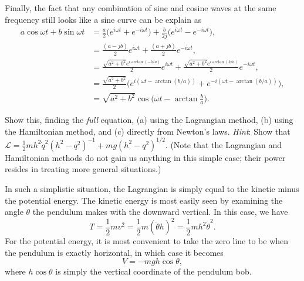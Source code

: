 \documentclass[../road-to-reality.tex]{subfiles}
\begin{document}
\begin{questions}
\begin{solution}
    Finally, the fact that any combination of sine and cosine waves at the same
    frequency still looks like a sine curve can be explain as
    \begin{align*}
      a\cos\omega{t} + b\sin\omega{t} &= \frac{a}{2}\Big(e^{i\omega{t}} + e^{-i\omega{t}}\Big) + \frac{b}{2j}\Big(e^{i\omega{t}} - e^{-i\omega{t}}\Big), \\
                                      &= \frac{(a - jb)}{2}e^{i\omega{t}} + \frac{(a + jb)}{2}e^{-i\omega{t}}, \\
                                      &= \frac{\sqrt{a^2+b^2}e^{i\arctan(-b/a)}}{2}e^{i\omega{t}} + \frac{\sqrt{a^2+b^2}e^{i\arctan(b/a)}}{2}e^{-i\omega{t}}, \\
                                      &= \frac{\sqrt{a^2+b^2}}{2}\Big(e^{i(\omega{t} - \arctan(b/a))} + e^{-i(\omega{t} - \arctan(b/a))}), \\
                                      &= \sqrt{a^2 + b^2}\cos\Big(\omega{t} - \arctan{\frac{b}{a}}\Big).
    \end{align*}
  \end{solution}

\question Show this, finding the \textit{full} equation, (a) using the
  Lagrangian method, (b) using the Hamiltonian method, and (c) directly from
  Newton's laws. \textit{Hint}: Show that
  $\mathcal{L}=\frac{1}{2}mh^2\dot{q}^2(h^2-q^2)^{-1} + mg(h^2-q^2)^{1/2}$.
  (Note that the Lagrangian and Hamiltonian methods do not gain us anything in
  this simple case; their power resides in treating more general situations.)

  \begin{solution}
    In such a simplistic situation, the Lagrangian is simply equal to the
    kinetic minus the potential energy. The kinetic energy is most easily seen
    by examining the angle $\theta$ the pendulum makes with the downward vertical. In
    this case, we have
    \[T = \frac{1}{2}mv^2 = \frac{1}{2}m(\dot{\theta}{h})^2 =
      \frac{1}{2}mh^2\dot{\theta}^2. \]
    For the potential energy, it is most convenient to take the zero line to be
    when the pendulum is exactly horizontal, in which case it becomes
    \[V = -mgh\cos\theta, \]
    where $h\cos\theta$ is simply the vertical coordinate of the pendulum bob.


\end{solution}
\end{questions}
\end{document}
